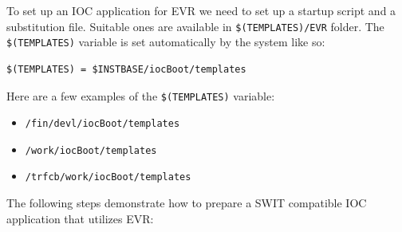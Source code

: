 \documentclass[12pt,a4paper]{article}
\begin{document}
To set up an IOC application for EVR we need to set up a startup script and a substitution file. Suitable ones are available in \texttt{\$(TEMPLATES)/EVR} folder. The \texttt{\$(TEMPLATES)} variable is set automatically by the system like so: 
\begin{verbatim}
$(TEMPLATES) = $INSTBASE/iocBoot/templates
\end{verbatim}
Here are a few examples of the \texttt{\$(TEMPLATES)} variable:
\begin{itemize}
	\item \texttt{/fin/devl/iocBoot/templates}
	\item \texttt{/work/iocBoot/templates}
	\item \texttt{/trfcb/work/iocBoot/templates}
\end{itemize}
The following steps demonstrate how to prepare a SWIT compatible IOC application that utilizes EVR:
\end{document}
